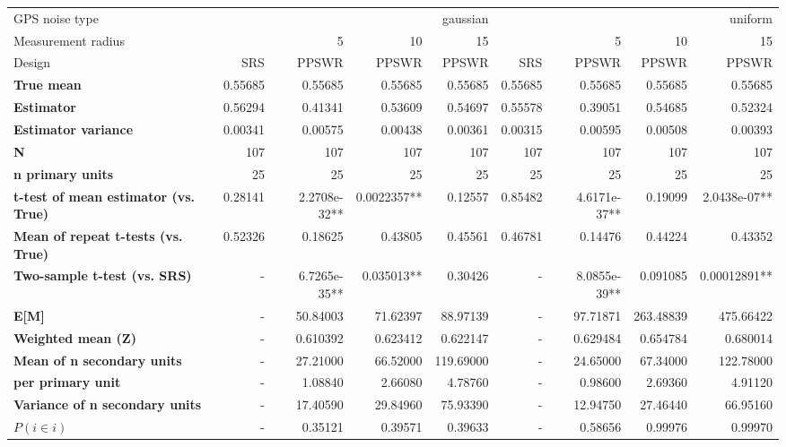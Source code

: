 \begin{tabular}{l|r|rrr|r|rrr}
\toprule
GPS noise type & \multicolumn{4}{r}{gaussian} & \multicolumn{4}{r}{uniform} \\
Measurement radius &  & 5 & 10 & 15 &  & 5 & 10 & 15 \\
Design & SRS & PPSWR & PPSWR & PPSWR & SRS & PPSWR & PPSWR & PPSWR \\
\midrule
\textbf{True mean} &  0.55685 &  0.55685 &  0.55685 &  0.55685 &  0.55685 &  0.55685 &  0.55685 &  0.55685 \\
\textbf{Estimator} & 0.56294 & 0.41341 & 0.53609 & 0.54697 & 0.55578 & 0.39051 & 0.54685 & 0.52324 \\
\textbf{Estimator variance} & 0.00341 & 0.00575 & 0.00438 & 0.00361 & 0.00315 & 0.00595 & 0.00508 & 0.00393 \\
\textbf{N} & 107 & 107 & 107 & 107 & 107 & 107 & 107 & 107 \\
\textbf{n primary units} & 25 & 25 & 25 & 25 & 25 & 25 & 25 & 25 \\
\textbf{t-test of mean estimator (vs. True)} & 0.28141 & 2.2708e-32** & 0.0022357** & 0.12557 & 0.85482 & 4.6171e-37** & 0.19099 & 2.0438e-07** \\
\textbf{Mean of repeat t-tests (vs. True)} & 0.52326 & 0.18625 & 0.43805 & 0.45561 & 0.46781 & 0.14476 & 0.44224 & 0.43352 \\
\textbf{Two-sample t-test (vs. SRS)} & - & 6.7265e-35** & 0.035013** & 0.30426 & - & 8.0855e-39** & 0.091085 & 0.00012891** \\
\textbf{E[M]} & - & 50.84003 & 71.62397 & 88.97139 & - & 97.71871 & 263.48839 & 475.66422 \\
\textbf{Weighted mean (Z)} & - & 0.610392 & 0.623412 & 0.622147 & - & 0.629484 & 0.654784 & 0.680014 \\
\textbf{Mean of n secondary units} & - & 27.21000 & 66.52000 & 119.69000 & - & 24.65000 & 67.34000 & 122.78000 \\
\textbf{     per primary unit} & - & 1.08840 & 2.66080 & 4.78760 & - & 0.98600 & 2.69360 & 4.91120 \\
\textbf{Variance of n secondary units} & - & 17.40590 & 29.84960 & 75.93390 & - & 12.94750 & 27.46440 & 66.95160 \\
\textbf{$P(i \in i)$} & - & 0.35121 & 0.39571 & 0.39633 & - & 0.58656 & 0.99976 & 0.99970 \\
\bottomrule
\end{tabular}
